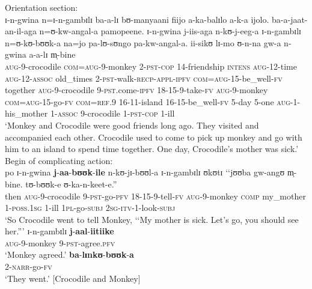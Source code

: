 \begin{exe}
	\ex \label{exNarrBeginningPlotUnequalNarr}
	\begin{xlist}
		\ex Orientation section:\\
		\gll ɪ-n-gwina n=ɪ-n-gambɪlɪ ba-a-lɪ bʊ-manyaani fiijo a-ka-balɪlo a-k-a ijolo. ba-a-jaat-an-il-aga n=ʊ-kw-angal-a pamopeene. ɪ-n-gwina j-iis-aga n-kʊ-j-eeg-a ɪ-n-gambɪlɪ n=ʊ-kʊ-bʊʊk-a na=jo pa-lʊ-sʊngo pa-kw-angal-a. ii-sikʊ lɪ-mo ʊ-n-na gw-a n-gwina a-a-lɪ m̩-bine\\
		\textsc{aug}-9-crocodile \textsc{com}=\textsc{aug}-9-monkey 2-\textsc{pst}-\textsc{cop} 14-friendship \textsc{intens} \textsc{aug}-12-time \textsc{aug}-12-\textsc{assoc} old\_times 2-\textsc{pst}-walk-\textsc{recp}-\textsc{appl}-\textsc{ipfv} \textsc{com}=\textsc{aug}-15-be\_well-\textsc{fv} together \textsc{aug}-9-crocodile 9-\textsc{pst}.come-\textsc{ipfv} 18-15-9-take-\textsc{fv} \textsc{aug}-9-monkey \textsc{com}=\textsc{aug}-15-go-\textsc{fv} \textsc{com}=\textsc{ref.9} 16-11-island 16-15-be\_well-\textsc{fv} 5-day 5-one \textsc{aug}-1-his\_mother 1-\textsc{assoc} 9-crocodile 1-\textsc{pst}-\textsc{cop} 1-ill\\
		\glt \lq Monkey and Crocodile were good friends long ago. They visited and accompanied each other. Crocodile used to come to pick up monkey and go with him to an island to spend time together. One day, Crocodile's mother was sick.' 
		\ex Begin of complicating action:\\
		\gll po ɪ-n-gwina \textbf{j}-\textbf{aa}-\textbf{bʊʊk}-\textbf{ile} n-kʊ-jɪ-bʊʊl-a ɪ-n-gambɪlɪ ʊkʊtɪ \textup{\lq\lq}jʊʊba gw-angʊ m̩-bine. tʊ-bʊʊk-e ʊ-ka-n-keet-e.\textup{''}\\
		then \textsc{aug}-9-crocodile 9-\textsc{pst}-go-\textsc{pfv} 18-15-9-tell-\textsc{fv} \textsc{aug}-9-monkey \textsc{comp} \phantom{\lq\lq}my\_mother 1-\textsc{poss.1sg} 1-ill \textsc{1pl}-go-\textsc{subj} \textsc{2sg}-\textsc{itv}-1-look-\textsc{subj}\\
		\glt \lq So Crocodile went to tell Monkey, \lq\lq My mother is sick. Let's go, you should see her.''{}'
		\ex\gll ɪ-n-gambɪlɪ \textbf{j}-\textbf{aal}-\textbf{iitiike}\\
		\textsc{aug}-9-monkey 9-\textsc{pst}-agree.\textsc{pfv}\\
		\glt \lq Monkey agreed.'
		\ex \label{exNarrBeginningPlotUnequalNarrSentence4} \gll \textbf{ba}-\textbf{lɪnkʊ}-\textbf{bʊʊk}-\textbf{a}\\
		2-\textsc{narr}-go-\textsc{fv}\\
		\glt \lq They went.' [Crocodile and Monkey]
	\end{xlist}
\end{exe}


